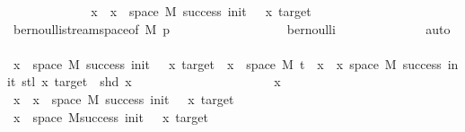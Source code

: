 \begin{isabellebody}
\ \ \ \ \ \ \ \ \ \ \isamarkupfalse%
\ \isamarkupfalse%
\ {\isachardoublequoteopen}x\ {\isasymin}\ {\isacharbraceleft}{\kern0pt}x\ {\isasymin}\ space\ M{\isachardot}{\kern0pt}\ success\ {\isacharparenleft}{\kern0pt}init\ {\isacharplus}{\kern0pt}\ {}{\isacharparenright}{\kern0pt}\ x\ target{\isacharbraceright}{\kern0pt}{\isachardoublequoteclose}\isanewline
\ \ \ \ \ \ \ \ \ \ \ \ \isamarkupfalse%
\ bernoulli{\isacharunderscore}{\kern0pt}stream{\isacharunderscore}{\kern0pt}space{\isacharbrackleft}{\kern0pt}of\ M\ p{\isacharbrackright}{\kern0pt}\isanewline
\ \ \ \ \ \ \ \ \ \ \ \ \ \ \ \ \ \ bernoulli\isanewline
\ \ \ \ \ \ \ \ \ \ \ \ \isamarkupfalse%
\ auto\isanewline
\ \ \ \ \ \ \ \ \isamarkupfalse%
\isanewline
\ \ \ \ \ \ \isamarkupfalse%
\ \isanewline
\ \ \ \ \ \ \ \ \isamarkupfalse%
\ {\isachardoublequoteopen}{\isacharbraceleft}{\kern0pt}x\ {\isasymin}\ space\ M{\isachardot}{\kern0pt}\ success\ {\isacharparenleft}{\kern0pt}init\ {\isacharplus}{\kern0pt}\ {}{\isacharparenright}{\kern0pt}\ x\ target{\isacharbraceright}{\kern0pt}\ {\isasymsubseteq}\ {\isacharbraceleft}{\kern0pt}x\ {\isasymin}\ space\ M{\isachardot}{\kern0pt}\ t\ {\isacharhash}{\kern0pt}{\isacharhash}{\kern0pt}\ x\ {\isasymin}\ {\isacharbraceleft}{\kern0pt}x{\isasymin}\ space\ M{\isachardot}{\kern0pt}\ success\ {\isacharparenleft}{\kern0pt}init{\isacharplus}{\kern0pt}{}{\isacharparenright}{\kern0pt}\ {\isacharparenleft}{\kern0pt}stl\ x{\isacharparenright}{\kern0pt}\ target\ {\isasymand}\ shd\ x{\isacharbraceright}{\kern0pt}{\isacharbraceright}{\kern0pt}{\isachardoublequoteclose}\isanewline
\ \ \ \ \ \ \ \ \isamarkupfalse%
\ \isanewline
\ \ \ \ \ \ \ \ \ \ \isamarkupfalse%
\ x\isanewline
\ \ \ \ \ \ \ \ \ \ \isamarkupfalse%
\ {\isachardoublequoteopen}x\ {\isasymin}\ {\isacharbraceleft}{\kern0pt}x\ {\isasymin}\ space\ M{\isachardot}{\kern0pt}\ success\ {\isacharparenleft}{\kern0pt}init\ {\isacharplus}{\kern0pt}\ {}{\isacharparenright}{\kern0pt}\ x\ target{\isacharbraceright}{\kern0pt}{\isachardoublequoteclose}\isanewline
\ \ \ \ \ \ \ \ \ \ \isamarkupfalse%
\ \isamarkupfalse%
\ {\isachardoublequoteopen}x\ {\isasymin}\ space\ M{\isachardoublequoteclose}{\isachardoublequoteopen}success\ {\isacharparenleft}{\kern0pt}init\ {\isacharplus}{\kern0pt}\ {}{\isacharparenright}{\kern0pt}\ x\ target{\isachardoublequoteclose}\isanewline
\ \ \ \ \ \ \ \ \ \ \ \ \isamarkupfalse%

\end{isabellebody}
